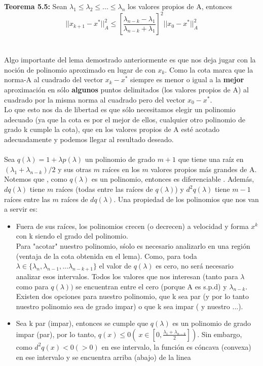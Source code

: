 \documentclass[12pt]{article}
\begin{document}
\begin{enumerate}
 
 {\bf Teorema 5.5: } Sean $\lambda_1 \le \lambda_2 \le ... \le \lambda_n$ los valores propios de A, entonces $$ ||x_{k+1} - x^*||_A^2 \le \left[\frac{\lambda_{n-k} - \lambda_1}{\lambda_{n-k} + \lambda_1}\right]^2||x_{0} - x^*||_A^2$$\\ \\
 \noindent Algo importante del lema demostrado anteriormente es que nos deja jugar con la noci\'on de polinomio aproximado en lugar de con $x_k$. Como la cota marca que la norma-A al cuadrado del vector $x_k - x^*$ siempre es menor o igual a la {\bf mejor} aproximaci\'on en s\'olo {\bf algunos } puntos delimitados (los valores propios de A) al cuadrado por la misma norma al cuadrado pero del vector $x_0 - x^*$. \\
  Lo que esto nos da de libertad es que s\'olo necesitamos elegir un polinomio adecuado (ya que la cota es por el mejor de ellos, cualquier otro polinomio de grado k cumple la cota), que en los valores propios de A est\'e acotado adecuadamente y podemos llegar al resultado deseado.\\
  \\
  Sea $q(\lambda)= 1+\lambda p(\lambda)$ un polinomio de grado $m+1$ que tiene una ra\'iz en $(\lambda_1+\lambda_{n-k})/2$ y sus otras $m$ ra\'ices en los $m$ valores propios m\'as grandes de A.
  Notemos que , como $q(\lambda)$ es un polinomio, entonces es diferenciable . Adem\'as, $dq(\lambda)$ tiene $m$ ra\'ices (todas entre las ra\'ices de $q(\lambda)$) y $d^2q(\lambda)$ tiene $m-1$ ra\'ices entre las $m$ ra\'ices de $dq(\lambda)$.
  Una propiedad de los polinomios que nos van a servir es:
  \begin{itemize}
  \item Fuera de sus ra\'ices, los polinomios crecen (o decrecen) a velocidad y forma $x^k$ con k siendo el grado del polinomio.\\
  Para "acotar" nuestro polinomio, s\'solo es necesario analizarlo en una regi\'on (ventaja de la cota obtenida en el lema). Como, para toda $\lambda \in \{\lambda_n, \lambda_{n-1},...\lambda_{n-k+1}\}$ el valor de $q(\lambda)$ es cero, no ser\'a necesario analizar esos intervalos. Todos los valores que nos interesan (tanto para $\lambda$ como para $q(\lambda))$ se encuentran entre el cero (porque A es s.p.d) y $\lambda_{n-k}$. 
  Existen dos opciones para nuestro polinomio, que k sea par (y por lo tanto nuestro polinomio sea de grado impar) o que k sea impar ( y nuestro ...). 
  \item Sea k par (impar), entonces se cumple que $q(\lambda)$ es un polinomio de grado impar (par), por lo tanto, $q(x) \le 0 (\ x \in \left[ 0, \frac{\lambda_1+ \lambda_{n-k}}{2}\right])$. Sin embargo, como $d^2q(x)< 0 (>0)$ en ese intervalo, la funci\'on es c\'oncava (convexa) en ese intervalo y se encuentra arriba (abajo) de la linea 

\end{itemize}
\end{enumerate}
\end{document}
